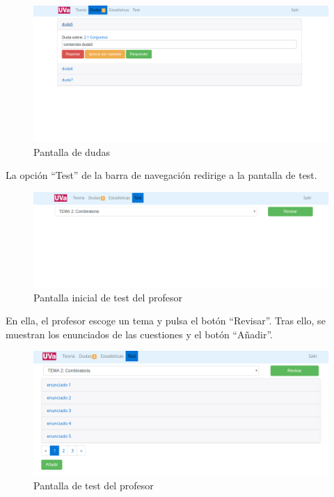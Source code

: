 \documentclass[openright,twoside,10pt]{book}
\begin{document}
    \begin{figure}[H]
        \begin{center}
            \includegraphics[width=\textwidth]{img/manual/profesor-dudas.png}
        \end{center}
        \caption{Pantalla de dudas}
    \end{figure}
    
    La opción \enquote{Test} de la barra de navegación redirige a la
    pantalla de test.
    
    \begin{figure}[H]
        \begin{center}
            \includegraphics[width=\textwidth]{img/manual/profesor-test.png}
        \end{center}
        \caption{Pantalla inicial de test del profesor}
    \end{figure}
    
    En ella, el profesor escoge un tema y pulsa el botón \enquote{Revisar}.
    Tras ello, se muestran los enunciados de las cuestiones y el botón
    \enquote{Añadir}.
    
    \begin{figure}[H]
        \begin{center}
            \includegraphics[width=\textwidth]{img/manual/profesor-test2.png}
        \end{center}
        \caption{Pantalla de test del profesor}
    \end{figure}
    
\end{document}
